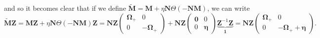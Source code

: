and so it becomes clear that if we define $\tilde{\bm{M}} = \bm{M} + \eta \bm{N}\Theta(-\bm{N}\bm{M})$, we can write
\begin{equation}
    \tilde{\bm{M}} \bm{Z} = \bm{M} \bm{Z} + \eta \bm{N}\Theta(-\bm{N}\bm{M}) \bm{Z} = \mathbf{N}\bm{Z}\left(\begin{array}{cc}
\boldsymbol{\Omega}_{+} & 0 \\
0 & -\boldsymbol{\Omega}_{+}
\end{array}\right) + \bm{N}\bm{Z} \left(\begin{array}{cc}\bm{0} & 0 \\ 0 & \bm{\eta}\end{array}\right) \underbrace{\bm{Z}^{-1} \bm{Z}}_{ \bm{1}} = \bm{N}\bm{Z}\left(\begin{array}{cc}\boldsymbol{\Omega}_{+} & 0 \\ 0 & -\boldsymbol{\Omega}_{+} + \bm{\eta}\end{array}\right).
\end{equation}


